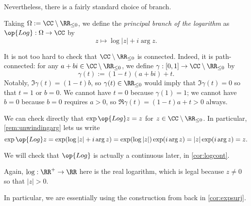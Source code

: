 Nevertheless, there is a fairly standard choice of branch.
\begin{defihelper} 
	Taking $\Omega:=\CC\setminus\RR_{\le0}$, we define the \textit{principal branch of the logarithm} as $\op{Log}:\Omega\to\CC$ by
	\[z\mapsto\log|z|+i\arg z.\]
\end{defihelper}
\begin{remark} \label{rem:checkconnected}
	It is not too hard to check that $\CC\setminus\RR_{\le0}$ is connected. Indeed, it is path-connected: for any $a+bi\in\CC\setminus\RR_{\le0}$, we define $\gamma:[0,1]\to\CC\setminus\RR_{\le0}$ by
	\[\gamma(t):=(1-t)(a+bi)+t.\]
	Notably, $\Im\gamma(t)=(1-t)b$, so $\gamma(t)\in\RR_{\le0}$ would imply that $\Im\gamma(t)=0$ so that $t=1$ or $b=0$. We cannot have $t=0$ because $\gamma(1)=1$; we cannot have $b=0$ because $b=0$ requires $a>0$, so $\Re\gamma(t)=(1-t)a+t>0$ always.
\end{remark}
\begin{remark} \label{rem:checklogisinverse}
	We can check directly that $\exp\op{Log}z=z$ for $z\in\CC\setminus\RR_{\le0}$. In particular, \autoref{rem:unwindingarg} lets us write
	\[\exp\op{Log}z=\exp(\log|z|+i\arg z)=\exp(\log|z|)\exp(i\arg z)=|z|\exp(i\arg z)=z.\]
\end{remark}
We will check that $\op{Log}$ is actually a continuous later, in \autoref{cor:logcont}.
\begin{remark}
	Again, $\log:\RR^+\to\RR$ here is the real logarithm, which is legal because $z\ne0$ so that $|z|>0$.
\end{remark}
In particular, we are essentially using the construction from back in \autoref{cor:expsurj}.

